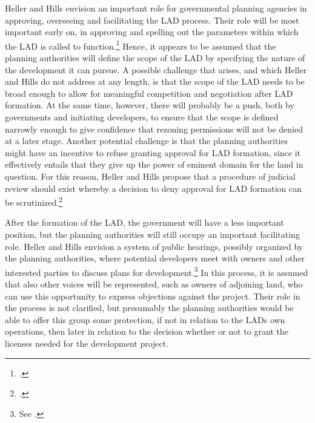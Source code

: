 \documentclass[12pt,a4paper]{book} %
\begin{document}
Heller and Hills envision an important role for governmental planning agencies in approving, overseeing and facilitating the LAD process. Their role will be most important early on, in approving and spelling out the parameters within which the LAD is called to function.\footcite[1489-1491]{heller08} Hence, it appears to be assumed that the planning authorities will define the scope of the LAD by specifying the nature of the development it can pursue. A possible challenge that arises, and which Heller and Hills do not address at any length, is that the scope of the LAD needs to be broad enough to allow for meaningful competition and negotiation after LAD formation. At the same time, however, there will probably be a push, both by governments and initiating developers, to ensure that the scope is defined narrowly enough to give confidence that rezoning permissions will not be denied at a later stage. Another potential challenge is that the planning authorities might have an incentive to refuse granting approval for LAD formation, since it effectively entails that they give up the power of eminent domain for the land in question. For this reason, Heller and Hills propose that a procedure of judicial review should exist whereby a decision to deny approval for LAD formation can be scrutinized.\footcite[1490]{heller08} 

After the formation of the LAD, the government will have a less important position, but the planning authorities will still occupy an important facilitating role. Heller and Hills envision a system of public hearings, possibly organized by the planning authorities, where potential developers meet with owners and other interested parties to discuss  plans for development.\footnote{See \cite[1490-1491]{heller08}.} In this process, it is assumed that also other voices will be represented, such as owners of adjoining land, who can use this opportunity to express objections against the project. Their role in the process is not clarified, but presumably the planning authorities would be able to offer this group some protection, if not in relation to the LADs own operations, then later in relation to the decision whether or not to grant the licenses needed for the development project.
\end{document}
